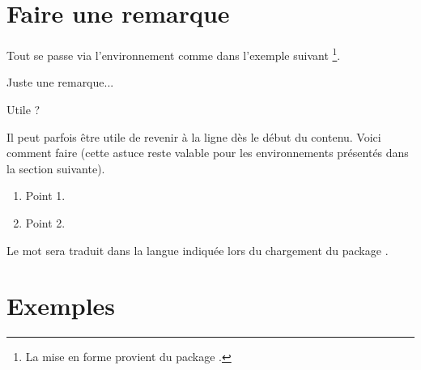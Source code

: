 

\usepackage[lang = french]{../main/main}
\usepackage{../macroenv/macroenv}
\usepackage{../showcase/showcase}
\usepackage{../listing/listing}
\usepackage{../rem-exa/rem-exa}
\usepackage{../inenglish/inenglish}

\usepackage{rem-exa}




\section{Faire une remarque}

Tout se passe via l'environnement  comme dans l'ex\-emple suivant
\footnote{
	La mise en forme provient du package .
}.

\begin{bdoclatex}[sbs]
    \begin{bdocrem}
        Juste une remarque...
    \end{bdocrem}
    
    \begin{bdocrem}
        Utile ?
    \end{bdocrem}
\end{bdoclatex}


Il peut parfois être utile de revenir à la ligne dès le début du contenu. Voici comment faire (cette astuce reste valable pour les environnements présentés dans la section suivante).

\begin{bdoclatex}[sbs]
    \begin{bdocrem}
        \leavevmode 
	 	  
        \begin{enumerate}
            \item Point 1.

            \item Point 2.
        \end{enumerate}
    \end{bdocrem}
\end{bdoclatex}


\begin{bdocrem}
	Le mot  sera traduit dans la langue indiquée lors du chargement du package .
\end{bdocrem}




\section{Exemples}

